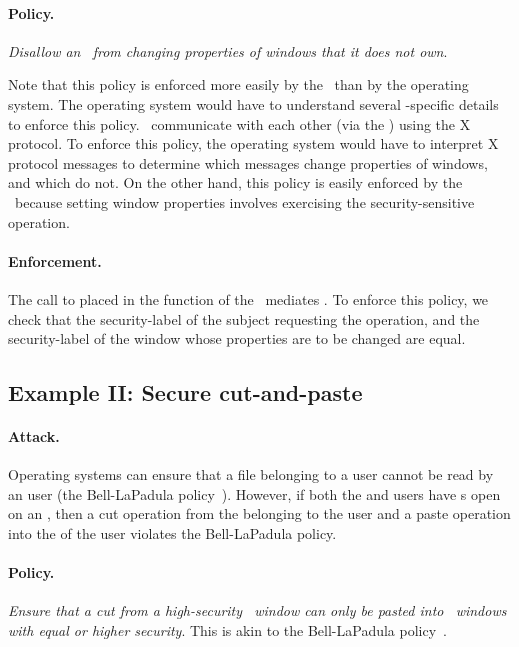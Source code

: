 \paragraph{Policy.} \textit{Disallow an \xclient\ from changing properties of
windows that it does not own}.  

Note that this policy is enforced more easily by the \xserver\ than by the
operating system. The operating system would have to understand several
\xserver-specific details to enforce this policy. \xclients\ communicate with
each other (via the \xserver) using the X protocol. To enforce this policy, the
operating system would have to interpret X protocol messages to determine which
messages change properties of windows, and which do not.  On the other hand,
this policy is easily enforced by the \xserver\ because setting window
properties involves exercising the  security-sensitive
operation.

\paragraph{Enforcement.} The call to  placed in the
 function of the \xserver\ mediates .
To enforce this policy, we check that the security-label of the subject
requesting the operation, and the security-label of the window whose properties
are to be changed are equal. 

\subsection{Example II: Secure cut-and-paste}

\paragraph{Attack.} Operating systems can ensure that a file belonging to a
 user cannot be read by an  user (the
Bell-LaPadula policy~\cite{bl76}).  However, if both the 
and  users have s open on an \xserver, then a
cut operation from the  belonging to the  user
and a paste operation into the  of the  user
violates the Bell-LaPadula policy.

\paragraph{Policy.} \textit{Ensure that a cut from a high-security \xclient\
window can only be pasted into \xclient\ windows with equal or higher
security}. This is akin to the Bell-LaPadula policy~\cite{bl76}.

